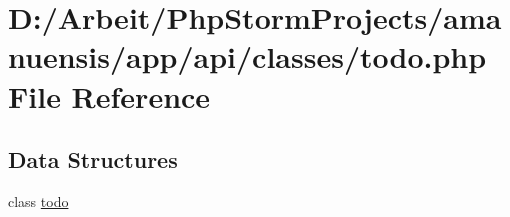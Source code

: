 \hypertarget{todo_8php}{}\section{D\+:/\+Arbeit/\+Php\+Storm\+Projects/amanuensis/app/api/classes/todo.php File Reference}
\label{todo_8php}
\subsection*{Data Structures}
\begin{DoxyCompactItemize}
\item 
class \hyperlink{classtodo}{todo}
\end{DoxyCompactItemize}

